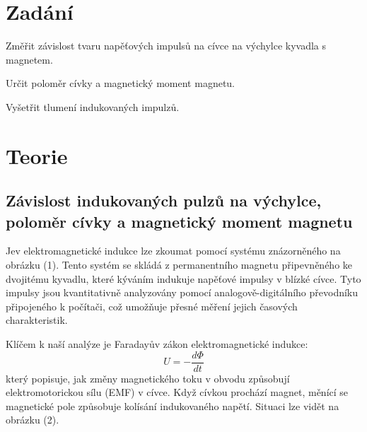 \documentclass[a4paper,11pt]{article}
\begin{document}
\vskip1cm
    \begin{minipage}[t]{0.5\textwidth} 
        \section{Zadání}
            Změřit závislost tvaru napěťových impulsů na cívce na výchylce kyvadla s magnetem.
            \par Určit poloměr cívky a magnetický moment magnetu.
            \par Vyšetřit tlumení indukovaných impulzů.
        \section{Teorie}
            \subsection{Závislost indukovaných pulzů na výchylce, poloměr cívky a magnetický moment magnetu}
                Jev elektromagnetické indukce lze zkoumat pomocí systému znázorněného na obrázku (1). Tento systém se skládá z permanentního magnetu připevněného ke dvojitému kyvadlu, které kýváním indukuje napěťové impulsy v blízké cívce. Tyto impulsy jsou kvantitativně analyzovány pomocí analogově-digitálního převodníku připojeného k počítači, což umožňuje přesné měření jejich časových charakteristik.
                \par Klíčem k naší analýze je Faradayův zákon elektromagnetické indukce:
                \begin{equation}
                    U = -\frac{d\Phi}{dt}
                \end{equation}
                který popisuje, jak změny magnetického toku v obvodu způsobují elektromotorickou sílu (EMF) v cívce. Když cívkou prochází magnet, měnící se magnetické pole způsobuje kolísání indukovaného napětí. Situaci lze vidět na obrázku (2).
    \end{minipage}
    \hspace{10pt}
\end{document}
